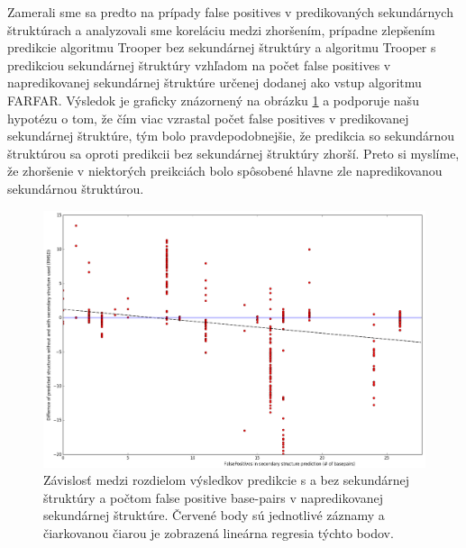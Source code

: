 \indent Zamerali sme sa predto na prípady false positives v predikovaných sekundárnych štruktúrach a analyzovali sme koreláciu medzi zhoršením, prípadne zlepšením predikcie algoritmu Trooper bez sekundárnej štruktúry a algoritmu Trooper s predikciou sekundárnej štruktúry vzhľadom na počet false positives v napredikovanej sekundárnej štruktúre určenej dodanej ako vstup algoritmu FARFAR. Výsledok je graficky znázornený na obrázku \ref{obr5.2} a podporuje našu hypotézu o tom, že čím viac vzrastal počet false positives v predikovanej sekundárnej štruktúre, tým bolo pravdepodobnejšie, že predikcia so sekundárnou štruktúrou sa oproti predikcii bez sekundárnej štruktúry zhorší. Preto si myslíme, že zhoršenie v niektorých preikciách bolo spôsobené hlavne zle napredikovanou sekundárnou štruktúrou.
\begin{figure}%
\includegraphics[width=\textwidth]{../img/corelation}
\caption{Závislosť medzi rozdielom výsledkov predikcie s a bez sekundárnej štruktúry a počtom false positive base-pairs v napredikovanej sekundárnej štruktúre. Červené body sú jednotlivé záznamy a čiarkovanou čiarou je zobrazená lineárna regresia týchto bodov.}
\label{obr5.2}
\end{figure}